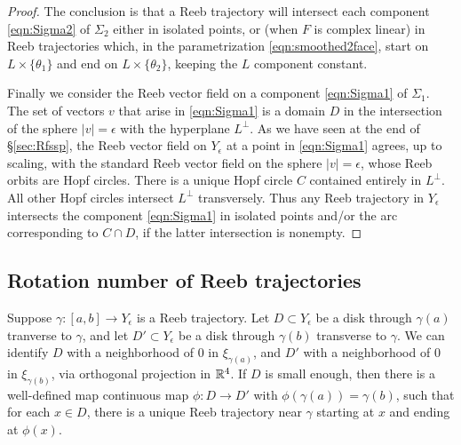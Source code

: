 \begin{proof}
The conclusion is that a Reeb trajectory will intersect each component \eqref{eqn:Sigma2} of $\Sigma_2$ either in isolated points, or (when $F$ is complex linear) in Reeb trajectories which, in the parametrization \eqref{eqn:smoothed2face}, start on $L\times \{\theta_1\}$ and end on $L\times\{\theta_2\}$, keeping the $L$ component constant.

Finally we consider the Reeb vector field on a component \eqref{eqn:Sigma1} of $\Sigma_1$. The set of vectors $v$ that arise in \eqref{eqn:Sigma1} is a domain $D$ in the intersection of the sphere $|v|=\epsilon$ with the hyperplane $L^\perp$. As we have seen at the end of \S\ref{sec:Rfssp}, the Reeb vector field on $Y_\epsilon$ at a point in \eqref{eqn:Sigma1} agrees, up to scaling, with the standard Reeb vector field on the sphere $|v|=\epsilon$, whose Reeb orbits are Hopf circles. There is a unique Hopf circle $C$ contained entirely in $L^\perp$. All other Hopf circles intersect $L^\perp$ transversely. Thus any Reeb trajectory in $Y_\epsilon$ intersects the component \eqref{eqn:Sigma1} in isolated points and/or the arc corresponding to $C\cap D$, if the latter intersection is nonempty.
\end{proof}

\subsection{Rotation number of Reeb trajectories}
\label{sec:srn}

Suppose $\gamma:[a,b]\to Y_\epsilon$ is a Reeb trajectory. Let $D\subset Y_\epsilon$ be a disk through $\gamma(a)$ tranverse to $\gamma$, and let $D'\subset Y_\epsilon$ be a disk through $\gamma(b)$ transverse to $\gamma$. We can identify $D$ with a neighborhood of $0$ in $\xi_{\gamma(a)}$, and $D'$ with a neighborhood of $0$ in $\xi_{\gamma(b)}$, via orthogonal projection in ${\mathbb R}^4$. If $D$ is small enough, then there is a well-defined map continuous map $\phi:D\to D'$ with $\phi(\gamma(a))=\gamma(b)$, such that for each $x\in D$, there is a unique Reeb trajectory near $\gamma$ starting at $x$ and ending at $\phi(x)$.

